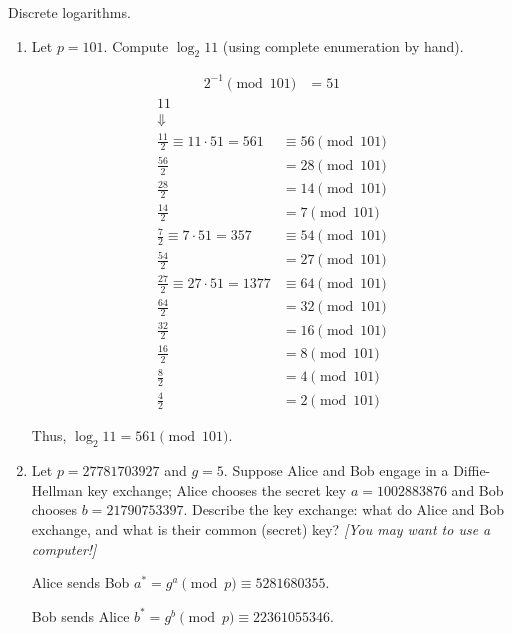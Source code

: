 \begin{problem}
  Discrete logarithms.
  \begin{enumerate}\renewcommand{\itemsep}{3mm}
    \item Let $p=101$.  Compute $\log_2 11$ (using complete enumeration by hand).
      \begin{Answer}
        \begin{align*}
          {2}^{-1} \pmod{101} &= 51
        \end{align*}
        \begin{align}
          11\\
          \nonumber \Downarrow\\
          \frac{11}{2} \equiv 11 \cdot 51 = 561 &\equiv 56 \pmod{101} \\
          \frac{56}{2} &= 28 \pmod{101} \\
          \frac{28}{2} &= 14 \pmod{101} \\
          \frac{14}{2} &= 7 \pmod{101} \\
          \frac{7}{2} \equiv 7 \cdot 51 = 357 &\equiv 54 \pmod{101} \\
          \frac{54}{2} &= 27 \pmod{101} \\
          \frac{27}{2} \equiv 27 \cdot 51 = 1377 &\equiv 64 \pmod{101} \\
          \frac{64}{2} &= 32 \pmod{101} \\
          \frac{32}{2} &= 16 \pmod{101} \\
          \frac{16}{2} &= 8 \pmod{101} \\
          \frac{8}{2} &= 4 \pmod{101} \\
          \frac{4}{2} &= 2 \pmod{101}
        \end{align}

        \noindent
        Thus, $\log_2 11 = 561 \pmod{101}$.
      \end{Answer}
    
      \newpage
    \item Let $p=27781703927$ and $g=5$.  Suppose Alice and Bob engage in
    a Diffie-Hellman key exchange; Alice chooses the secret key
    $a=1002883876$ and Bob chooses $b=21790753397$.  Describe the key
    exchange: what do Alice and Bob exchange, and what is their common
    (secret) key?  \emph{[You may want to use a computer!]}
    \begin{Answer}
      Alice sends Bob $a^* = g^{a} \pmod{p} \equiv 5281680355$.

      \noindent
      Bob sends Alice $b^* = g^{b} \pmod{p} \equiv 22361055346$.


\end{Answer}
\end{enumerate}
\end{problem}
